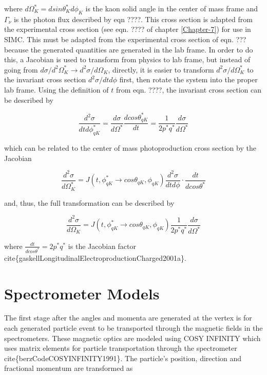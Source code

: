 \documentclass[
]{report}
\begin{document}
\noindent where \(d\Omega^*_{K}=dsin\theta^*_Kd\phi_K\) is the kaon
solid angle in the center of mass frame and \(\Gamma_{\nu}\) is the
photon flux described by eqn ????. This cross section is adapted from
the experimental cross section (see eqn. ???? of chapter
\ref{Chapter-7}) for use in SIMC. This must be adapted from the
experimental cross section of eqn. ??? because the generated quantities
are generated in the lab frame. In order to do this, a Jacobian is used
to transform from physics to lab frame, but instead of going from
\(d\sigma/d^2\Omega^*_K\rightarrow d^2\sigma/d\Omega_K\), directly, it
is easier to transform \(d^2\sigma/d\Omega^*_K\) to the invariant cross
section \(d^2\sigma/dtd\phi\) first, then rotate the system into the
proper lab frame. Using the definition of \(t\) from eqn. ????, the
invariant cross section can be described by

\begin{equation} 
  \frac{d^2\sigma}{dt d\phi^*_{qK}}=\frac{d\sigma}{d\Omega^*}\frac{d cos\theta^*_{qK}}{dt}=\frac{1}{2p^*q^*}\frac{d\sigma}{d\Omega^*}
  \label{eq:sig_ordertwo_tphi} 
\end{equation}

which can be related to the center of mass photoproduction cross section
by the Jacobian

\begin{equation} 
  \frac{d^2\sigma}{d\Omega^*_K}=J(t,\phi^*_{qK}\rightarrow cos\theta_{qK},\phi_{qK})\frac{d^2\sigma}{dtd\phi}\cdot\frac{dt}{d cos\theta^*}
  \label{eq:sig_ordertwo_virtual_physics} 
\end{equation}

\noindent and, thus, the full transformation can be described by

\begin{equation} 
  \frac{d^2\sigma}{d\Omega_K}=J(t,\phi^*_{qK}\rightarrow cos\theta_{qK},\phi_{qK})\frac{1}{2p^*q^*}\frac{d\sigma}{d\Omega^*}
  \label{eq:sig_ordertwo_virtual_lab} 
\end{equation}

\noindent where \(\frac{dt}{d cos\theta^*}=2p^*q^*\) is the Jacobian
factor cite\{gaskellLongitudinalElectroproductionCharged2001a\}.

\hypertarget{Section-6.3}{%
\section{Spectrometer Models}\label{Section-6.3}}

The first stage after the angles and momenta are generated at the vertex
is for each generated particle event to be transported through the
magnetic fields in the spectrometers. These magnetic optics are modeled
using COSY INFINITY which uses matrix elements for particle
transportation through the spectrometer
cite\{berzCodeCOSYINFINITY1991\}. The particle's position, direction and
fractional momentum are transformed as
\end{document}
